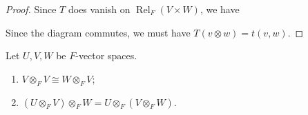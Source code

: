 \documentclass[10pt]{mypackage}
\begin{document}
\begin{proof}
    Since $T$ does vanish on $\operatorname{Rel}_{F}\left(V\times W\right)$, we have
    \begin{center}
    \end{center}
    Since the diagram commutes, we must have $T\left(v\otimes w\right) = t\left(v,w\right)$.
  \end{proof}
  \begin{corollary}
    Let $U,V,W$ be $F$-vector spaces.
    \begin{enumerate}[(1)]
      \item $V\otimes_{F} V \cong W\otimes_{F} V$;
      \item $\left(U\otimes_{F} V\right)\otimes_{F}W = U\otimes_{F}\left(V\otimes_{F} W\right)$.
    \end{enumerate}
  \end{corollary}
\end{document}
